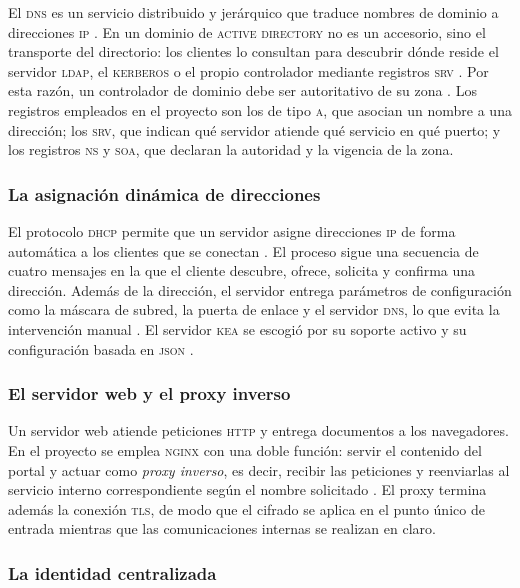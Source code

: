El \textsc{dns} es un servicio distribuido y jer\'arquico que traduce
nombres de dominio a direcciones \textsc{ip} \cite{rfc1034}. En un dominio
de \textsc{active directory} no es un accesorio, sino el transporte del
directorio: los clientes lo consultan para descubrir d\'onde reside el
servidor \textsc{ldap}, el \textsc{kerberos} o el propio controlador
mediante registros \textsc{srv} \cite{rfc2782}. Por esta raz\'on, un
controlador de dominio debe ser autoritativo de su zona
\cite{msft_activedirectory}. Los registros empleados en el proyecto son
los de tipo \textsc{a}, que asocian un nombre a una direcci\'on; los
\textsc{srv}, que indican qu\'e servidor atiende qu\'e servicio en qu\'e
puerto; y los registros \textsc{ns} y \textsc{soa}, que declaran la
autoridad y la vigencia de la zona.

\subsubsection{La asignaci\'on din\'amica de direcciones}

El protocolo \textsc{dhcp} permite que un servidor asigne direcciones
\textsc{ip} de forma autom\'atica a los clientes que se conectan
\cite{rfc2131}. El proceso sigue una secuencia de cuatro mensajes en la que
el cliente descubre, ofrece, solicita y confirma una direcci\'on. Adem\'as
de la direcci\'on, el servidor entrega par\'ametros de configuraci\'on
como la m\'ascara de subred, la puerta de enlace y el servidor
\textsc{dns}, lo que evita la intervenci\'on manual \cite{droms1997}. El
servidor \textsc{kea} se escogi\'o por su soporte activo y su
configuraci\'on basada en \textsc{json} \cite{keaDocs}.

\subsubsection{El servidor web y el proxy inverso}

Un servidor web atiende peticiones \textsc{http} y entrega documentos a
los navegadores. En el proyecto se emplea \textsc{nginx} con una doble
funci\'on: servir el contenido del portal y actuar como \textit{proxy
inverso}, es decir, recibir las peticiones y reenviarlas al servicio
interno correspondiente seg\'un el nombre solicitado \cite{nginxDocs}. El
proxy termina adem\'as la conexi\'on \textsc{tls}, de modo que el
cifrado se aplica en el punto \'unico de entrada mientras que las
comunicaciones internas se realizan en claro.

\subsubsection{La identidad centralizada}

